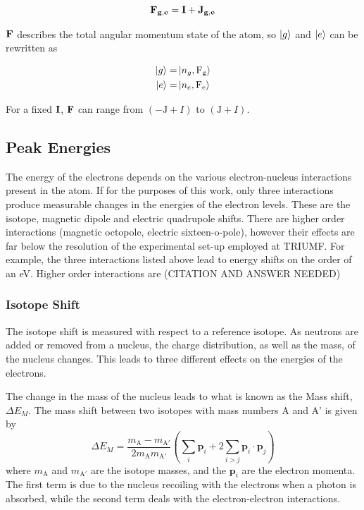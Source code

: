 \documentclass[12pt,a4paper,margin=1in]{report}
\begin{document}
\begin{equation}
\bf{F_{g,e}} = \bf{I} + \bf{J_{g,e}}
\end{equation}

$\bf{F}$ describes the total angular momentum state of the atom, so $\ket{g}$ and $\ket{e}$ can be rewritten as

\begin{align}
\ket{g} =& \ket{n_g,\mathrm{F_g}}\\
\ket{e} =& \ket{n_e,\mathrm{F_e}}
\end{align}

For a fixed $\bf{I}$, $\bf{F}$ can range from $(-\mathrm{J}+I)$ to $(\mathrm{J}+I)$.
\subsection{Peak Energies}
The energy of the electrons depends on the various electron-nucleus interactions present in the atom. If for the purposes of this work, only three interactions produce measurable changes in the energies of the electron levels. These are the isotope, magnetic dipole and electric quadrupole shifts. There are higher order interactions (magnetic octopole, electric sixteen-o-pole), however their effects are far below the resolution of the experimental set-up employed at TRIUMF. For example, the three interactions listed above lead to energy shifts on the order of an eV. Higher order interactions are (CITATION AND ANSWER NEEDED) 

\subsubsection*{Isotope Shift}
The isotope shift is measured with respect to a reference isotope. As neutrons are added or removed from a nucleus, the charge distribution, as well as the mass, of the nucleus changes. This leads to three different effects on the energies of the electrons. 

The change in the mass of the nucleus leads to what is known as the Mass shift, $\Delta E_M$. The mass shift between two isotopes with mass numbers A and A' is given by
\begin{equation}
\Delta E_M = \frac{m_{\mathrm{A}}-m_{\mathrm{A'}}}{2 m_{\mathrm{A}} m_{\mathrm{A'}}} \left(\sum_i\mathrm{\textbf{p}}_i +2 \sum_{i>j}\mathrm{\textbf{p}}_i \cdot \mathrm{\textbf{p}}_j \right)
\end{equation}
where $m_{\mathrm{A}}$ and $m_{\mathrm{A'}}$ are the isotope masses, and the $\textbf{p}_i$ are the electron momenta. The first term is due to the nucleus recoiling with the electrons when a photon is absorbed, while the second term deals with the electron-electron interactions.  
\end{document}
